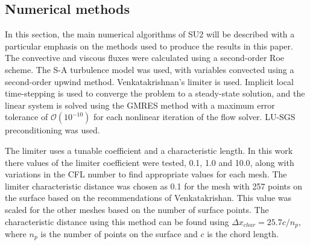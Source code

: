 
\subsection*{Numerical methods}
In this section, the main numerical algorithms of SU2 will be described with a particular emphasis on the methods used to produce the results in this paper. The convective and viscous fluxes were calculated using a second-order Roe scheme. The S-A turbulence model was used, with variables convected using a second-order upwind method. Venkatakrishnan's limiter is used. Implicit local time-stepping is used to converge the problem to a steady-state solution, and the linear system is solved using the GMRES method with a maximum error tolerance of $\mathcal{O}(10^{-10})$ for each nonlinear iteration of the flow solver. LU-SGS preconditioning was used.

The limiter uses a tunable coefficient and a characteristic length. In this work there values of the limiter coefficient were tested, 0.1, 1.0 and 10.0, along with variations in the CFL number to find appropriate values for each mesh. The limiter characteristic distance was chosen as 0.1 for the mesh with 257 points on the surface based on the recommendations of Venkatakrishan\cite{Venkatakrishnan:1993}. This value was scaled for the other meshes based on the number of surface points. The characteristic distance using this method can be found using $\Delta x_{char} = 25.7 c  / n_p $, where $n_p$ is the number of points on the surface and $c$ is the chord length. 

